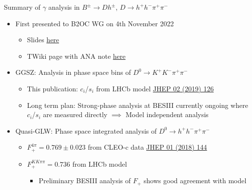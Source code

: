 \documentclass{beamer}
\begin{document}
\begin{frame}{Summary of $\gamma$ analysis in $B^\pm\to Dh^\pm$, $D\to h^+h^-\pi^+\pi^-$}
  \vspace{0.5cm}
  \begin{itemize}
    \setlength\itemsep{1.2em}
    \item{First presented to B2OC WG on 4th November 2022}
    \begin{itemize}
      \item{Slides \href{https://indico.cern.ch/event/1085269/\#7-b-dkkpipih}{here}}
      \item{TWiki page with ANA note \href{https://twiki.cern.ch/twiki/bin/view/LHCbPhysics/GGSZB2DhD2hhpipiModelIndependent}{here}}
    \end{itemize}
    \item{GGSZ: Analysis in phase space bins of $D^0\to K^+K^-\pi^+\pi^-$}
    \begin{itemize}
      \item{This publication: $c_i$/$s_i$ from LHCb model \href{https://arxiv.org/abs/1811.08304}{JHEP 02 (2019) 126}}
      \item{Long term plan: Strong-phase analysis at BESIII currently ongoing where $c_i$/$s_i$ are measured directly $\implies$ Model independent analysis}
    \end{itemize}
    \item{Quasi-GLW: Phase space integrated analysis of $D^0\to h^+h^-\pi^+\pi^-$}
    \begin{itemize}
      \item{$F_+^{4\pi} = 0.769 \pm 0.023$ from CLEO-c data \href{https://arxiv.org/abs/1709.03467}{JHEP 01 (2018) 144}}
      \item{$F_+^{KK\pi\pi} = 0.736$ from LHCb model}
      \begin{itemize}
        \item{Preliminary BESIII analysis of $F_+$ shows good agreement with model}
      \end{itemize}
    \end{itemize}
  \end{itemize}
\end{frame}
\end{document}
